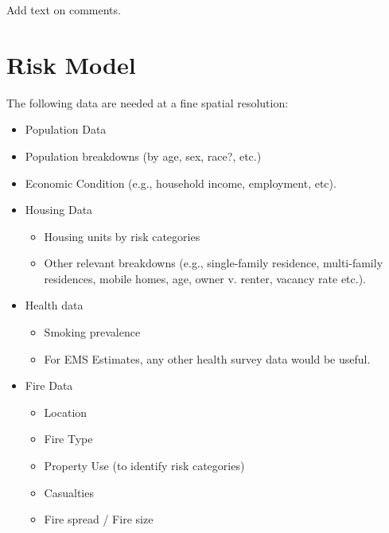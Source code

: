 \documentclass[12pt,oneside]{book}
\begin{document}
Add text on comments.

\clearpage

\section{Risk Model}
The following data are needed at a fine spatial resolution:

\begin{itemize}
  \item Population Data
  \item Population breakdowns (by age, sex, race?, etc.)
  \item Economic Condition (e.g., household income, employment, etc).
  \item Housing Data
    \begin{itemize}
      \item Housing units by risk categories
      \item Other relevant breakdowns (e.g., single-family residence, multi-family residences, mobile homes, age, owner v. renter, vacancy rate etc.).
    \end{itemize}
  \item Health data
    \begin{itemize}
      \item Smoking prevalence
      \item For EMS Estimates, any other health survey data would be useful.
    \end{itemize}
  \item Fire Data
    \begin{itemize}
      \item Location
      \item Fire Type
      \item Property Use (to identify risk categories)
      \item Casualties
      \item Fire spread / Fire size
    \end{itemize}
\end{itemize}
\end{document}
